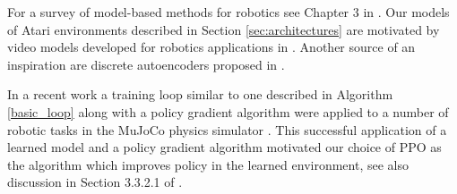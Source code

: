 For a survey of model-based methods for robotics see Chapter 3 in \cite{deisenroth}.
Our models of Atari environments described in Section \ref{sec:architectures} are motivated by video models developed for robotics applications in \cite{embed_to_control, deep_spatial, finn2016, sv2p, ebert, hafner, piergiovanni, paxton, rybkin-pertsch}.  Another source of an inspiration are discrete autoencoders proposed in \cite{neural_discrete, auto_discrete}.

In a recent work \cite{trpo_ensemble} a training loop similar to one described in  Algorithm \ref{basic_loop} along with a policy gradient algorithm \cite{trpo} were applied to a number of robotic tasks in the MuJoCo physics simulator \cite{mujoco}.  This successful application of a learned model and a policy gradient algorithm motivated our choice of PPO \cite{ppo} as the algorithm which improves policy in the learned environment, see also discussion in Section 3.3.2.1 of \cite{deisenroth}. %

